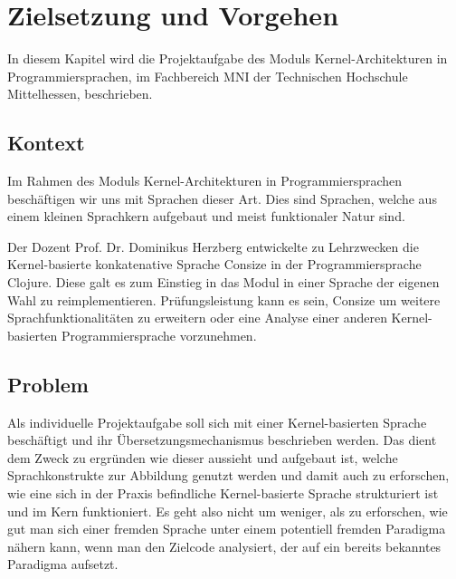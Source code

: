 \documentclass[
12pt,
ngerman,
oneside]
{scrbook} %
\begin{document}

\tableofcontents %

\newpage %



\chapter{Zielsetzung und Vorgehen}
In diesem Kapitel wird die Projektaufgabe des Moduls Kernel-Architekturen in Programmiersprachen, im Fachbereich MNI der Technischen Hochschule Mittelhessen, beschrieben.

\section{Kontext}
Im Rahmen des Moduls Kernel-Architekturen in Programmiersprachen beschäftigen wir uns mit Sprachen dieser Art. Dies sind Sprachen, welche aus einem kleinen Sprachkern aufgebaut und meist funktionaler Natur sind.

Der Dozent Prof. Dr. Dominikus Herzberg entwickelte zu Lehrzwecken die Kernel-basierte konkatenative Sprache Consize in der Programmiersprache Clojure. Diese galt es zum Einstieg in das Modul in einer Sprache der eigenen Wahl zu reimplementieren. Prüfungsleistung kann es sein, Consize um weitere Sprachfunktionalitäten zu erweitern oder eine Analyse einer anderen Kernel-basierten Programmiersprache vorzunehmen. 

\section{Problem}
Als individuelle Projektaufgabe soll sich mit einer Kernel-basierten Sprache beschäftigt und ihr Übersetzungsmechanismus beschrieben werden. Das dient dem Zweck zu ergründen wie dieser aussieht und aufgebaut ist, welche Sprachkonstrukte zur Abbildung genutzt werden und damit auch zu erforschen, wie eine sich in der Praxis befindliche Kernel-basierte Sprache strukturiert ist und im Kern funktioniert. Es geht also nicht um weniger, als zu erforschen, wie gut man sich einer fremden Sprache unter einem potentiell fremden Paradigma nähern kann, wenn man den Zielcode analysiert, der auf ein bereits bekanntes Paradigma aufsetzt.
\end{document}
